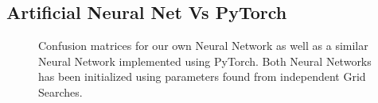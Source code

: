 \documentclass
[twocolumn,
secnumarabic,
nobibnotes,
aps,
prl,
reprint,
groupedaddress,
amsmath,
amssymb
]{revtex4-2}
\begin{document}
\subsection{Artificial Neural Net Vs PyTorch}
\begin{figure}
  \caption{Confusion matrices for our own Neural Network as well as a similar Neural Network implemented using PyTorch. Both Neural Networks has been initialized using parameters found from independent Grid Searches.\label{fig:conf_matrix_home_torch}}
\end{figure}
\end{document}

